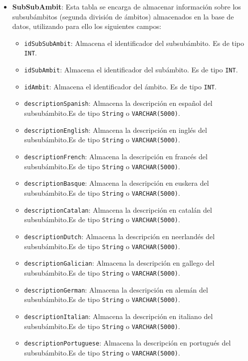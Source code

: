 \begin{itemize}


    \item \textbf{SubSubAmbit}: Esta tabla se encarga de almacenar información sobre los subsubámbitos (segunda división de ámbitos) almacenados en la base de datos, utilizando para ello los siguientes campos:
        \begin{itemize}
        \item \texttt{idSubSubAmbit}: Almacena el identificador del subsubámbito. Es de tipo \texttt{INT}.
        \item \texttt{idSubAmbit}: Almacena el identificador del subámbito. Es de tipo \texttt{INT}.
        \item \texttt{idAmbit}: Almacena el identificador del ámbito. Es de tipo \texttt{INT}.
        \item \texttt{descriptionSpanish}: Almacena la descripción en español del subsubámbito.Es de tipo \texttt{String} o \texttt{VARCHAR(5000)}.
        \item \texttt{descriptionEnglish}: Almacena la descripción en inglés del subsubámbito.Es de tipo \texttt{String} o \texttt{VARCHAR(5000)}.
        \item \texttt{descriptionFrench}: Almacena la descripción en francés del subsubámbito.Es de tipo \texttt{String} o \texttt{VARCHAR(5000)}.
        \item \texttt{descriptionBasque}: Almacena la descripción en euskera del subsubámbito.Es de tipo \texttt{String} o \texttt{VARCHAR(5000)}.
        \item \texttt{descriptionCatalan}: Almacena la descripción en catalán del subsubámbito.Es de tipo \texttt{String} o \texttt{VARCHAR(5000)}.
        \item \texttt{descriptionDutch}: Almacena la descripción en neerlandés del subsubámbito.Es de tipo \texttt{String} o \texttt{VARCHAR(5000)}.
        \item \texttt{descriptionGalician}: Almacena la descripción en gallego del subsubámbito.Es de tipo \texttt{String} o \texttt{VARCHAR(5000)}.
        \item \texttt{descriptionGerman}: Almacena la descripción en alemán del subsubámbito.Es de tipo \texttt{String} o \texttt{VARCHAR(5000)}.
        \item \texttt{descriptionItalian}: Almacena la descripción en italiano del subsubámbito.Es de tipo \texttt{String} o \texttt{VARCHAR(5000)}.
        \item \texttt{descriptionPortuguese}: Almacena la descripción en portugués del subsubámbito.Es de tipo \texttt{String} o \texttt{VARCHAR(5000)}.

\end{itemize}
\end{itemize}
